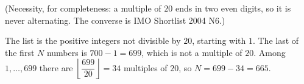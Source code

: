 (Necessity, for completeness: a multiple of $20$ ends in two even digits, so it is never alternating. The converse is IMO Shortlist 2004 N6.)

The list is the positive integers not divisible by $20$, starting with $1$. The last of the first $N$ numbers is $700-1=699$, which is not a multiple of $20$. Among $1,\dots,699$ there are $\left\lfloor\dfrac{699}{20}\right\rfloor=34$ multiples of $20$, so $N=699-34=\boxed{665}$.
